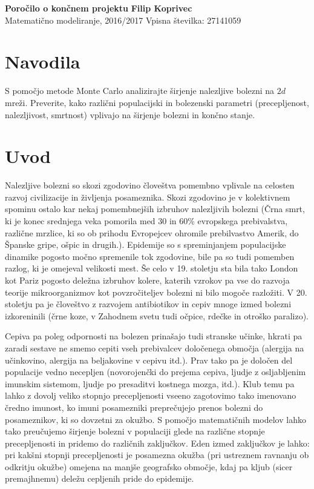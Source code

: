\documentclass[a4paper, 11pt]{article}
\begin{document}
\noindent
\large\textbf{Poročilo o končnem projektu} \hfill \textbf{Filip Koprivec} \\
\normalsize Matematično modeliranje, 2016/2017 \hfill Vpisna številka: 27141059 \\


\section*{Navodila}
S pomočjo metode Monte Carlo analizirajte širjenje nalezljive bolezni na $2d$ mreži. Preverite, kako različni populacijski in bolezenski parametri (precepljenost, nalezljivost, smrtnost) vplivajo na širjenje bolezni in končno stanje.

\section*{Uvod}
Nalezljive bolezni so skozi zgodovino človeštva pomembno vplivale na celosten razvoj civilizacije in življenja posameznika. Skozi zgodovino je v kolektivnem spominu ostalo kar nekaj pomembnejših izbruhov nalezljivih bolezni (Črna smrt, ki je konec srednjega veka pomorila med 30 in 60\% evropskega prebivalstva, različne mrzlice, ki so ob prihodu Evropejcev ohromile prebilvastvo Amerik, do Španske gripe, ošpic in drugih.). Epidemije so s spreminjanjem populacijske dinamike pogosto močno spremenile tok zgodovine, bile pa so tudi pomemben razlog, ki je omejeval velikosti mest. Še celo v 19. stoletju sta bila tako London kot Pariz pogosto deležna izbruhov kolere, katerih vzrokov pa vse do razvoja teorije mikroorganizmov kot povzročiteljev bolezni ni bilo mogoče razložiti. V 20. stoletju pa je človeštvo z razvojem antibiotikov in cepiv mnoge izmed bolezni izkoreninili (črne koze, v Zahodnem svetu tudi očpice, rdečke in otroško paralizo).

Cepiva pa poleg odpornosti na bolezen prinašajo tudi stranske učinke, hkrati pa zaradi sestave ne smemo cepiti vseh prebivalcev določenega območja (alergija na učinkovino, alergija na beljakovine v cepivu itd.). Prav tako pa je določen del populacije vedno necepljen (novorojenčki do prejema cepiva, ljudje z osljabljenim imunskim sistemom, ljudje po presaditvi kostnega mozga, itd.). Klub temu pa lahko z dovolj veliko stopnjo precepljenosti vseeno zagotovimo tako imenovano čredno imunost, ko imuni posamezniki preprečujejo prenos bolezni do posameznikov, ki so dovzetni za okužbo. S pomočjo matematičnih modelov lahko tako preučujemo širjenje bolezni v populaciji glede na različne stopnje precepljenosti in pridemo do različnih zaključkov. Eden izmed zaključkov je lahko: pri kakšni stopnji precepljenosti je posamezna okužba (pri ustreznem ravnanju ob odkritju okužbe) omejena na manjše geografsko območje, kdaj pa kljub (sicer premajhnemu) deležu cepljenih pride do epidemije.
\end{document}
